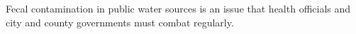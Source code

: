 Fecal contamination in public water sources is an issue that health officials and city and county governments must combat regularly.


